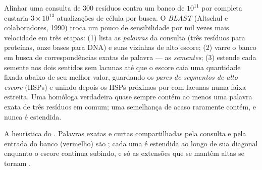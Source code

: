 \begin{definition}[BLAST]\label{def:b3:bioinformatics:blast}
Alinhar uma consulta de \num{300} resíduos contra um banco de $10^{11}$
por  completa custaria $3\times 10^{13}$
atualizações de célula por busca. O \emph{BLAST} (Altschul e
colaboradores, 1990) troca um pouco de sensibilidade por mil vezes mais
velocidade em três etapas: (1) lista as \emph{palavras} da consulta
(três resíduos para proteínas, onze bases para DNA) e suas vizinhas de
alto escore; (2) varre o banco em busca de correspondências exatas de
palavra --- as \emph{sementes}; (3) estende cada semente nos dois
sentidos sem lacunas até que o escore caia uma quantidade fixada abaixo
de seu melhor valor, guardando os \emph{pares de segmentos de alto
escore} (HSPs) e unindo depois os HSPs próximos por  com lacunas numa faixa estreita. Uma homóloga verdadeira quase
sempre contém ao menos uma palavra exata de três resíduos em comum; uma
semelhança de acaso raramente contém, e nunca é estendida.
\end{definition}

\begin{omfigure}

{\small A heurística do . Palavras exatas e curtas compartilhadas
pela consulta e pela entrada do banco (vermelho) são ; cada uma
é estendida ao longo de sua diagonal enquanto o escore continua
subindo, e só as extensões que se mantêm altas se tornam .}
\end{omfigure}

